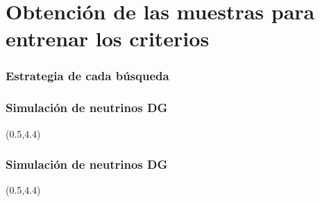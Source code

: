 \section[Muestras]{Obtenci\'on de las muestras para entrenar los criterios}

\begin{frame}
 \frametitle{Estrategia de cada b\'usqueda}
 \begin{center}
 \end{center}
\end{frame}

\begin{frame}
 \frametitle{Simulaci\'on de neutrinos DG}
 \begin{textblock}{14.5}(0.5,4.4)
 \end{textblock}
 
\end{frame}

\begin{frame}
 \frametitle{Simulaci\'on de neutrinos DG}
 \begin{textblock}{14.5}(0.5,4.4)
 \end{textblock}
 
\end{frame}
